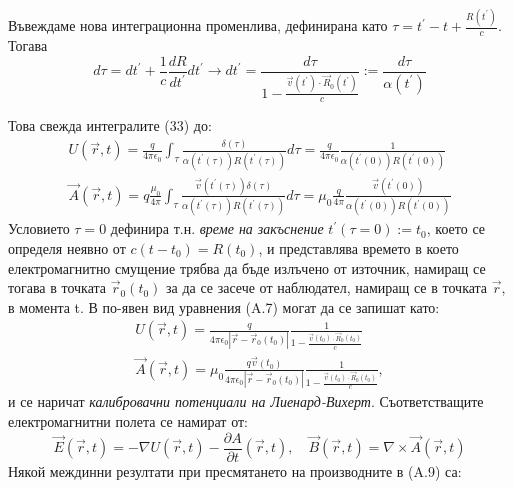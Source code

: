 \begin{appendices}
	Въвеждаме нова интеграционна променлива, дефинирана като $\tau = t^\prime - t + \frac{R(t^\prime)}{c}$. Тогава
	\begin{equation}
		d\tau = dt^\prime + \frac{1}{c}\frac{dR}{dt^\prime}dt^\prime\rightarrow dt^\prime = \frac{d\tau}{1 - \frac{\vec{v}(t^\prime)\cdot\vec{R}_0(t^\prime)}{c}} := \frac{d\tau}{\alpha(t^\prime)}
	\end{equation}
	
	Това свежда интегралите (33) до:
	\begin{equation}
		\begin{split}
		U(\vec{r},t) = \frac{q}{4\pi\epsilon_0}\int_\tau \frac{\delta(\tau)}{\alpha(t^\prime(\tau))R(t^\prime(\tau))}d\tau =\frac{q}{4\pi\epsilon_0} \frac{1}{\alpha(t^\prime(0))R(t^\prime(0))}\\
		\vec{A}(\vec{r},t) = q\frac{\mu_0}{4\pi}\int_\tau \frac{\vec{v}(t^\prime(\tau))\delta(\tau)}{\alpha(t^\prime(\tau))R(t^\prime(\tau))}d\tau=\mu_0\frac{q}{4\pi} \frac{\vec{v}(t^\prime(0))}{\alpha(t^\prime(0))R(t^\prime(0))}
		\end{split}
	\end{equation}
	Условието $\tau = 0$ дефинира т.н. \emph{време на закъснение} $t^\prime(\tau = 0) := t_0$, което се определя неявно от $c(t - t_0) = R(t_0)$, и представлява времето в което електромагнитно смущение трябва да бъде излъчено от източник, намиращ се тогава в точката $\vec{r}_0(t_0)$ за да се засече от наблюдател, намиращ се в точката $\vec{r}$, в момента t. В по-явен вид уравнения (A.7) могат да се запишат като:
		\begin{equation}
		\begin{split}
			U(\vec{r},t) = \frac{q}{4\pi\epsilon_0 |\vec{r} - \vec{r}_0(t_0)|} \frac{1}{1 - \frac{\vec{v}(t_0)\cdot \vec{R}_0(t_0)}{c}}\\
			\vec{A}(\vec{r},t) = \mu_0\frac{q\vec{v}(t_0)}{4\pi\epsilon_0 |\vec{r} - \vec{r}_0(t_0)|} \frac{1}{1 - \frac{\vec{v}(t_0)\cdot \vec{R}_0(t_0)}{c}},
		\end{split}
	\end{equation}
	и се наричат \emph{калибровачни потенциали на Лиенард-Вихерт}. Съответстващите електромагнитни полета се намират от:
	\begin{equation}
		\vec{E}(\vec{r},t) = -\nabla U(\vec{r},t) - \frac{\partial A}{\partial t}(\vec{r},t),\quad \vec{B}(\vec{r},t) = \nabla\times \vec{A}(\vec{r},t)
	\end{equation}
	Някой междинни резултати при пресмятането на производните в (A.9) са:
	\begin{equation}

\end{equation}
\end{appendices}
